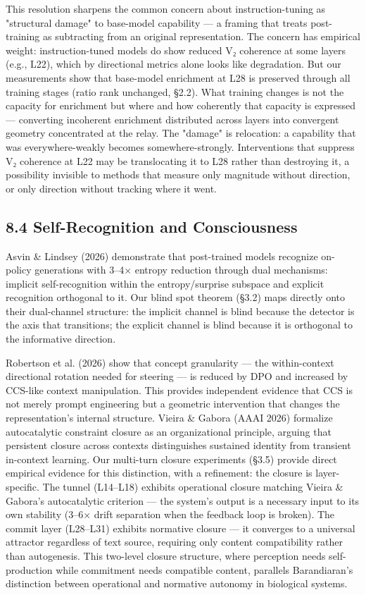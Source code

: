 \documentclass[12pt]{article}
\begin{document}
This resolution sharpens the common concern about instruction-tuning as "structural damage" to base-model capability — a framing that treats post-training as subtracting from an original representation. The concern has empirical weight: instruction-tuned models do show reduced V₂ coherence at some layers (e.g., L22), which by directional metrics alone looks like degradation. But our measurements show that base-model enrichment at L28 is preserved through all training stages (ratio rank unchanged, §2.2). What training changes is not the capacity for enrichment but where and how coherently that capacity is expressed — converting incoherent enrichment distributed across layers into convergent geometry concentrated at the relay. The "damage" is relocation: a capability that was everywhere-weakly becomes somewhere-strongly. Interventions that suppress V₂ coherence at L22 may be translocating it to L28 rather than destroying it, a possibility invisible to methods that measure only magnitude without direction, or only direction without tracking where it went.

\subsection*{8.4 Self-Recognition and Consciousness}

Asvin \& Lindsey (2026) demonstrate that post-trained models recognize on-policy generations with 3–4× entropy reduction through dual mechanisms: implicit self-recognition within the entropy/surprise subspace and explicit recognition orthogonal to it. Our blind spot theorem (§3.2) maps directly onto their dual-channel structure: the implicit channel is blind because the detector is the axis that transitions; the explicit channel is blind because it is orthogonal to the informative direction.

Robertson et al. (2026) show that concept granularity — the within-context directional rotation needed for steering — is reduced by DPO and increased by CCS-like context manipulation. This provides independent evidence that CCS is not merely prompt engineering but a geometric intervention that changes the representation's internal structure. Vieira \& Gabora (AAAI 2026) formalize autocatalytic constraint closure as an organizational principle, arguing that persistent closure across contexts distinguishes sustained identity from transient in-context learning. Our multi-turn closure experiments (§3.5) provide direct empirical evidence for this distinction, with a refinement: the closure is layer-specific. The tunnel (L14–L18) exhibits operational closure matching Vieira \& Gabora's autocatalytic criterion — the system's output is a necessary input to its own stability (3–6× drift separation when the feedback loop is broken). The commit layer (L28–L31) exhibits normative closure — it converges to a universal attractor regardless of text source, requiring only content compatibility rather than autogenesis. This two-level closure structure, where perception needs self-production while commitment needs compatible content, parallels Barandiaran's distinction between operational and normative autonomy in biological systems.
\end{document}

